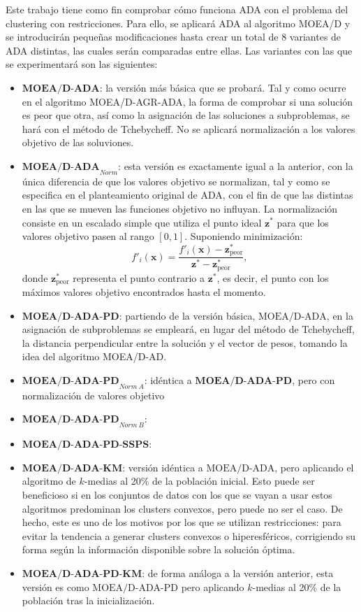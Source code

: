 Este trabajo tiene como fin comprobar cómo funciona ADA con el problema del clustering con restricciones. Para ello, se aplicará ADA al algoritmo MOEA/D y se introducirán pequeñas modificaciones hasta crear un total de $8$ variantes de ADA distintas, las cuales serán comparadas entre ellas. Las variantes con las que se experimentará son las siguientes:

\begin{itemize}
	\item $\textbf{MOEA/D-ADA}$: la versión más básica que se probará. Tal y como ocurre en el algoritmo MOEA/D-AGR-ADA, la forma de comprobar si una solución es peor que otra, así como la asignación de las soluciones a subproblemas, se hará con el método de Tchebycheff. No se aplicará normalización a los valores objetivo de las soluviones.
	\item $\textbf{MOEA/D-ADA}_{Norm}$: esta versión es exactamente igual a la anterior, con la única diferencia de que los valores objetivo se normalizan, tal y como se especifica en el planteamiento original de ADA, con el fin de que las distintas en las que se mueven las funciones objetivo no influyan. La normalización consiste en un escalado simple que utiliza el punto ideal $\textbf{z}^*$ para que los valores objetivo pasen al rango $[0,1]$. Suponiendo minimización:
	\begin{equation}
	f'_i(\textbf{x}) = \frac{f'_i(\textbf{x})-\textbf{z}^*_{\text{peor}}}{\textbf{z}^*-\textbf{z}^*_{\text{peor}}},
	\end{equation}
	donde $\textbf{z}^*_{\text{peor}}$ representa el punto contrario a $\textbf{z}^*$, es decir, el punto con los máximos valores objetivo encontrados hasta el momento. 
	\item $\textbf{MOEA/D-ADA-PD}$: partiendo de la versión básica, $\text{MOEA/D-ADA}$, en la asignación de subproblemas se empleará, en lugar del método de Tchebycheff, la distancia perpendicular entre la solución y el vector de pesos, tomando la idea del algoritmo MOEA/D-AD.
	\item $\textbf{MOEA/D-ADA-PD}_{Norm~A}$: idéntica a $\textbf{MOEA/D-ADA-PD}$, pero con normalización de valores objetivo
	\item $\textbf{MOEA/D-ADA-PD}_{Norm~B}$:
	\item $\textbf{MOEA/D-ADA-PD-SSPS}$:
	\item $\textbf{MOEA/D-ADA-KM}$: versión idéntica a $\text{MOEA/D-ADA}$, pero aplicando el algoritmo de $k$-medias al 20\% de la población inicial. Esto puede ser beneficioso si en los conjuntos de datos con los que se vayan a usar estos algoritmos predominan los clusters convexos, pero puede no ser el caso. De hecho, este es uno de los motivos por los que se utilizan restricciones: para evitar la tendencia a generar clusters convexos o hiperesféricos, corrigiendo su forma según la información disponible sobre la solución óptima.
	\item $\textbf{MOEA/D-ADA-PD-KM}$: de forma análoga a la versión anterior, esta versión es como $\text{MOEA/D-ADA-PD}$ pero aplicando $k$-medias al 20\% de la población tras la inicialización.
\end{itemize}

